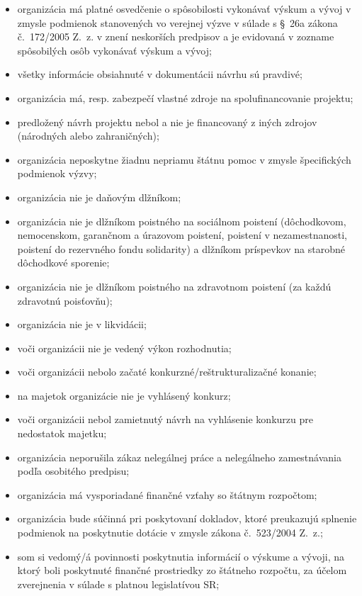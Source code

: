 \documentclass[10pt,a4paper]{article}
\begin{document}
\begin{itemize}[leftmargin=*]
  \item organizácia má platné osvedčenie o spôsobilosti vykonávať výskum a vývoj v zmysle podmienok stanovených vo verejnej výzve v súlade s \S~26a zákona č.~172/2005 Z.~z. v znení neskorších predpisov a je evidovaná v zozname spôsobilých osôb vykonávať výskum a vývoj;
  \item všetky informácie obsiahnuté v dokumentácii návrhu sú pravdivé;
  \item organizácia má, resp. zabezpečí vlastné zdroje na spolufinancovanie projektu;
  \item predložený návrh projektu nebol a nie je financovaný z iných zdrojov (národných alebo zahraničných);
  \item organizácia neposkytne žiadnu nepriamu štátnu pomoc v zmysle špecifických podmienok výzvy;
  \item organizácia nie je daňovým dlžníkom;
  \item organizácia nie je dlžníkom poistného na sociálnom poistení (dôchodkovom, nemocenskom, garančnom a úrazovom poistení, poistení v nezamestnanosti, poistení do rezervného fondu solidarity) a dlžníkom príspevkov na starobné dôchodkové sporenie;
  \item organizácia nie je dlžníkom poistného na zdravotnom poistení (za každú zdravotnú poisťovňu);
  \item organizácia nie je v likvidácii;
  \item voči organizácii nie je vedený výkon rozhodnutia;
  \item voči organizácii nebolo začaté konkurzné/reštrukturalizačné konanie;
  \item na majetok organizácie nie je vyhlásený konkurz;
  \item voči organizácii nebol zamietnutý návrh na vyhlásenie konkurzu pre nedostatok majetku;
  \item organizácia neporušila zákaz nelegálnej práce a nelegálneho zamestnávania podľa osobitého predpisu;
  \item organizácia má vysporiadané finančné vzťahy so štátnym rozpočtom;
  \item organizácia bude súčinná pri poskytovaní dokladov, ktoré preukazujú splnenie podmienok na poskytnutie dotácie v zmysle zákona č.~523/2004 Z.~z.;
  \item som si vedomý/á povinnosti poskytnutia informácií o výskume a vývoji, na ktorý boli poskytnuté finančné prostriedky zo štátneho rozpočtu, za účelom zverejnenia v súlade s platnou legislatívou SR;

\end{itemize}
\end{document}
